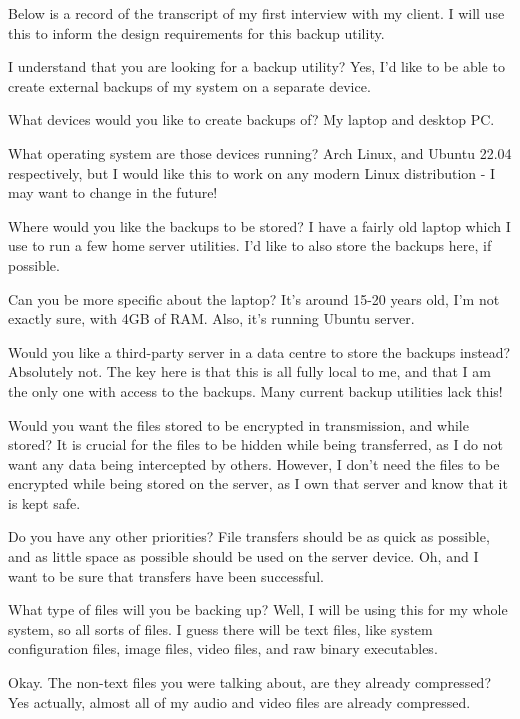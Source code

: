\documentclass[../main.tex]{subfiles}
\begin{document}
Below is a record of the transcript of my first interview with my client. I will use this to inform the design requirements for this backup utility. 

\begin{qanda}

\Q I understand that you are looking for a backup utility? 
\A Yes, I'd like to be able to create external backups of my system on a separate device. 

\Q What devices would you like to create backups of? 
\A My laptop and desktop PC. 

\Q What operating system are those devices running? 
\A Arch Linux, and Ubuntu 22.04 respectively, but I would like this to work on any modern Linux distribution - I may want to change in the future! 

\Q Where would you like the backups to be stored? 
\A I have a fairly old laptop which I use to run a few home server utilities. I’d like to also store the backups here, if possible. 

\Q Can you be more specific about the laptop? 
\A It's around 15-20 years old, I'm not exactly sure, with 4GB of RAM. Also, it's running Ubuntu server. 

\Q Would you like a third-party server in a data centre to store the backups instead? 
\A Absolutely not. The key here is that this is all fully local to me, and that I am the only one with access to the backups. Many current backup utilities lack this! 

\Q Would you want the files stored to be encrypted in transmission, and while stored? 
\A It is crucial for the files to be hidden while being transferred, as I do not want any data being intercepted by others. However, I don't need the files to be encrypted while being stored on the server, as I own that server and know that it is kept safe.

\Q Do you have any other priorities? 
\A File transfers should be as quick as possible, and as little space as possible should be used on the server device. Oh, and I want to be sure that transfers have been successful. 

\Q What type of files will you be backing up? 
\A Well, I will be using this for my whole system, so all sorts of files. I guess there will be text files, like system configuration files, image files, video files, and raw binary executables. 

\Q Okay. The non-text files you were talking about, are they already compressed? 
\A Yes actually, almost all of my audio and video files are already compressed. 


\end{qanda}
\end{document}
